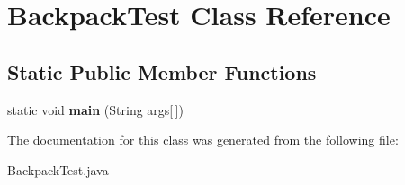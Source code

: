 \hypertarget{class_backpack_test}{}\section{Backpack\+Test Class Reference}
\label{class_backpack_test}
\subsection*{Static Public Member Functions}
\begin{DoxyCompactItemize}
\item 
\hypertarget{class_backpack_test_aebaf9b3ce7f692226da1a603c4c15379}{}static void {\bfseries main} (String args\mbox{[}$\,$\mbox{]})\label{class_backpack_test_aebaf9b3ce7f692226da1a603c4c15379}

\end{DoxyCompactItemize}


The documentation for this class was generated from the following file\+:\begin{DoxyCompactItemize}
\item 
Backpack\+Test.\+java\end{DoxyCompactItemize}
